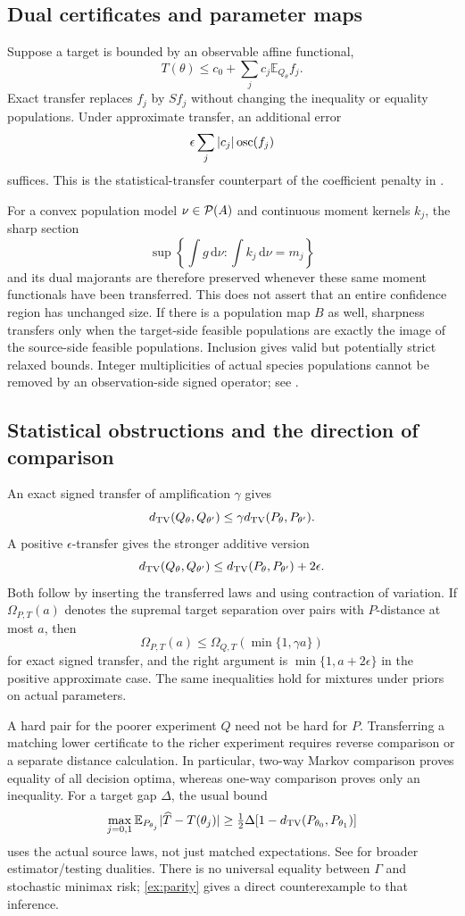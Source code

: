 \documentclass[11pt]{article}
\numberwithin{equation}{section}
\theoremstyle{definition}
\theoremstyle{remark}
\newcommand{\E}{\mathbb E}\newcommand{\Pp}{\mathbb P}\newcommand{\R}{\mathbb R}\newcommand{\N}{\mathbb N}
\newcommand{\dd}{\,\mathrm d}\newcommand{\norm}[1]{\left\lVert#1\right\rVert}\newcommand{\Scal}{\mathsf S}\newcommand{\Tcal}{\mathsf T}
\begin{document}
\subsection{Dual certificates and parameter maps}
Suppose a target is bounded by an observable affine functional,
\[
 T(\theta)\le c_0+\sum_jc_j\E_{Q_\theta}f_j.
\]
Exact transfer replaces $f_j$ by $Sf_j$ without changing the inequality or equality populations. Under approximate transfer, an additional error
\[
 \epsilon\sum_j|c_j|\operatorname{osc}(f_j)
\]
suffices. This is the statistical-transfer counterpart of the coefficient penalty in \cite[Theorem 4.2]{LongI}.

For a convex population model $\nu\in\mathcal P(A)$ and continuous moment kernels $k_j$, the sharp section
\[
 \sup\left\{\int g\dd\nu:\int k_j\dd\nu=m_j\right\}
\]
and its dual majorants are therefore preserved whenever these same moment functionals have been transferred. This does not assert that an entire confidence region has unchanged size. If there is a population map $B$ as well, sharpness transfers only when the target-side feasible populations are exactly the image of the source-side feasible populations. Inclusion gives valid but potentially strict relaxed bounds. Integer multiplicities of actual species populations cannot be removed by an observation-side signed operator; see \cite[Section 6]{LongI}.

\subsection{Statistical obstructions and the direction of comparison}
An exact signed transfer of amplification $\gamma$ gives
\begin{equation}\label{eq:TVamp}
 d_{\rm TV}(Q_\theta,Q_{\theta'})\le\gamma d_{\rm TV}(P_\theta,P_{\theta'}).
\end{equation}
A positive $\epsilon$-transfer gives the stronger additive version
\[
 d_{\rm TV}(Q_\theta,Q_{\theta'})\le d_{\rm TV}(P_\theta,P_{\theta'})+2\epsilon.
\]
Both follow by inserting the transferred laws and using contraction of variation. If $\Omega_{P,T}(a)$ denotes the supremal target separation over pairs with $P$-distance at most $a$, then
\[
 \Omega_{P,T}(a)\le\Omega_{Q,T}(\min\{1,\gamma a\})
\]
for exact signed transfer, and the right argument is $\min\{1,a+2\epsilon\}$ in the positive approximate case. The same inequalities hold for mixtures under priors on actual parameters.

A hard pair for the poorer experiment $Q$ need not be hard for $P$. Transferring a matching lower certificate to the richer experiment requires reverse comparison or a separate distance calculation. In particular, two-way Markov comparison proves equality of all decision optima, whereas one-way comparison proves only an inequality. For a target gap $\Delta$, the usual bound
\[
 \max_{j=0,1}\E_{P_{\theta_j}}|\widehat T-T(\theta_j)|
 \ge\tfrac12\Delta[1-\TV(P_{\theta_0},P_{\theta_1})]
\]
uses the actual source laws, not just matched expectations. See \cite{PolyanskiyWu2021} for broader estimator/testing dualities. There is no universal equality between $\Gamma$ and stochastic minimax risk; \cref{ex:parity} gives a direct counterexample to that inference.
\end{document}
